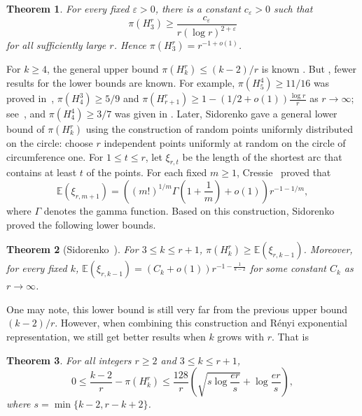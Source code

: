 \documentclass[10pt,a4paper]{amsart}
\numberwithin{equation}{section}
\newtheorem{theorem}{Theorem}[section]
\begin{document}
\begin{theorem}\label{end:thm:main}
For every fixed $\varepsilon>0$, there is a constant $c_\varepsilon>0$ such that
$$\pi(H_3^r)\ge \frac{c_\varepsilon}{r(\log r)^{2+\varepsilon}}$$
for all sufficiently large $r$.  
Hence $\pi(H_3^r)=r^{-1+o(1)}$.
\end{theorem}

For $k\ge4$, the general upper bound $\pi(H_k^r)\le (k-2)/r$ is known \cite{MarkstromThomassen2021}.
But , fewer results  for the lower bounds are known. For example, $\pi(H_5^4)\ge 11/16$ was proved in~\cite{deCaenKreherWiseman1988,Giraud1990}, $\pi(H_4^3)\ge 5/9$ and $\pi(H_{r+1}^r)\ge 1-\left(1/2+o(1)\right)\frac{\log r}{r}$ as $r\to\infty$; see~\cite{Sidorenko1995,Sidorenko1997}, and  $\pi(H_4^4)\ge 3/7$  was given in \cite{Sidorenko2024}. Later, Sidorenko  gave a general lower bound of $\pi(H_k^r)$ using the construction  of random points uniformly distributed on the circle: choose $r$ independent points uniformly at random on the circle of circumference one.
For $1\le t\le r$, let $\xi_{r,t}$ be the length of the shortest arc that contains at least $t$ of the points.
For each fixed $m\ge1$, Cressie~\cite{Cressie1977Gap} proved that
$$ \mathbb{E}(\xi_{r,m+1})=\left((m!)^{1/m}\Gamma\left(1+\frac1m\right)+o(1)\right)r^{-1-1/m},$$
where $\Gamma$ denotes the gamma function. Based on this construction, Sidorenko proved the following lower bounds.

\begin{theorem}[Sidorenko~\cite{Sidorenko2024}]\label{thm:sidorenko}
For $3\le k\le r+1$, $\pi(H_k^r)\ge\mathbb{E}(\xi_{r,k-1})$. Moreover, for every fixed $k$, 
$\mathbb{E}(\xi_{r,k-1})=(C_k+o(1))r^{-1-\frac{1}{k-2}}$ for some constant $C_k$ as $r\to \infty$.
\end{theorem}


One may note, this lower bound is still very far from the previous upper bound  $(k-2)/r$.
However, when combining this construction and R\'enyi exponential representation, we still get better results when $k$ grows with $r$. That is 


\begin{theorem}\label{thm:main}
For all integers $r\ge2$ and $3\le k\le r+1$, 
\begin{equation*}
 0\le \frac{k-2}{r}-\pi(H_k^r)\le \frac{128}{r}\left(\sqrt{s \log\frac{er}{s}}+\log\frac{er}{s}\right),
\end{equation*}
where $s=\min\{k-2,r-k+2\}$.
\end{theorem}
\end{document}
